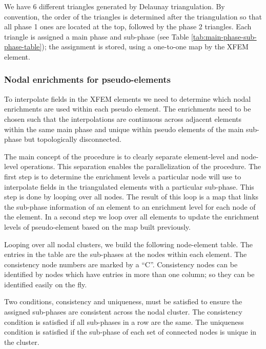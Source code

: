 We have 6 different triangles generated by Delaunay triangulation. By convention, the order of the triangles is determined after the triangulation so that all phase 1 ones are located at the top, followed by the phase 2 triangles. Each triangle is assigned a main phase and sub-phase (see Table \ref{tab:main-phase-sub-phase-table}); the assignment is stored, using a one-to-one map by the XFEM element.


\subsubsection{Nodal enrichments for pseudo-elements}

To interpolate fields in the XFEM elements we need to determine which nodal enrichments are used within each pseudo element.  The enrichments need to be chosen such that the interpolations are continuous across adjacent elements within the same main phase and unique within pseudo elements of the main sub-phase but topologically disconnected.

The main concept of the procedure is to clearly separate element-level and node-level operations. This separation enables the parallelization of the procedure. The first step is to determine the enrichment levels a particular node will use to interpolate fields in the triangulated elements with a particular sub-phase. This step is done by looping over all nodes. The result of this loop is a map that links the sub-phase information of an element to an enrichment level for each node of the element. In a second step we loop over all elements to update the enrichment levels of pseudo-element based on the map built previously.

Looping over all nodal clusters, we build the following node-element table. The entries in the table are the sub-phases at the nodes within each element. The consistency node numbers are marked by a ``C''. Consistency nodes can be identified by nodes which have entries in more than one column; so they can be identified easily on the fly.

Two conditions, consistency and uniqueness, must be satisfied to ensure the assigned sub-phases are consistent across the nodal cluster. The consistency condition is satisfied if all sub-phases in a row are the same. The uniqueness condition is satisfied if the sub-phase of each set of connected nodes is unique in the cluster.

